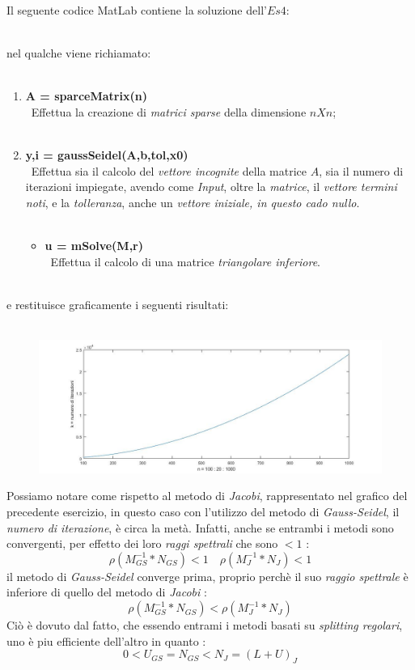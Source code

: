 Il seguente codice MatLab contiene la soluzione dell'$Es 4$:\\\

nel qualche viene richiamato:\\\
\begin{enumerate}
	\item \textbf{A = sparceMatrix(n)}\\\
		Effettua la creazione di \textit{matrici sparse} della dimensione $nXn$;\\\
	\item \textbf{y,i = gaussSeidel(A,b,tol,x0)}\\\
		Effettua sia il calcolo del \textit{vettore incognite} della matrice $A$, sia il numero di iterazioni impiegate, avendo come \textit{Input}, oltre la 	\textit{matrice}, il \textit{vettore termini noti}, e la \textit{tolleranza}, anche un \textit{vettore iniziale, in questo cado nullo}.\\\
		
	\begin{itemize}
		\item \textbf{u = mSolve(M,r)}\\\
			Effettua il calcolo di una matrice \textit{triangolare inferiore}.\\\
			
	\end{itemize}
\end{enumerate}
e restituisce graficamente i seguenti risultati:\\\
	\begin{figure}[H]
		\includegraphics[width=\textwidth]{Plot/Cap_6_Es_4}
	\end{figure}
Possiamo notare come rispetto al metodo di \textit{Jacobi}, rappresentato nel grafico del precedente esercizio, in questo caso con l'utilizzo del metodo di \textit{Gauss-Seidel}, il \textit{numero di iterazione}, è circa la metà. Infatti, anche se entrambi i metodi sono convergenti, per effetto dei loro \textit{raggi spettrali} che sono $<1$ :
	\[
		\rho(M^{-1}_{GS}*N_{GS})<1 \quad \rho(M^{-1}_{J}*N_{J})<1
	\]
il metodo di \textit{Gauss-Seidel} converge prima, proprio perchè il suo \textit{raggio spettrale} è inferiore di quello del metodo di \textit{Jacobi} :
	\[
		\rho(M^{-1}_{GS}*N_{GS})<\rho(M^{-1}_{J}*N_{J})
	\]
Ciò è dovuto dal fatto, che essendo entrami i metodi basati su \textit{splitting regolari}, uno è piu efficiente dell'altro in quanto :
	\[
		0<U_{GS}=N_{GS}<N_{J}=(L+U)_{J}
	\]
